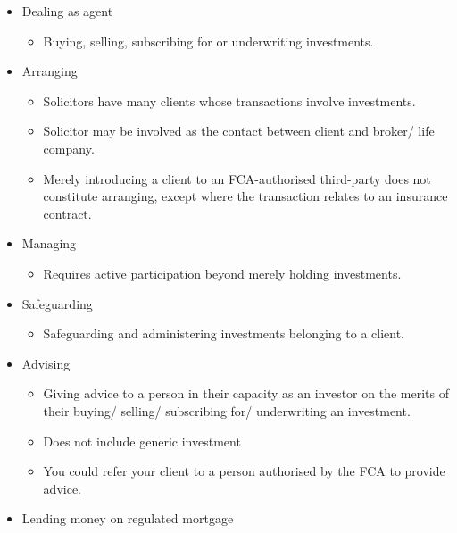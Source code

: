 \documentclass[
]{article}
\providecommand{\tightlist}{%
  \setlength{\itemsep}{0pt}\setlength{\parskip}{0pt}}
\begin{document}
\begin{itemize}
\tightlist
\item
  Dealing as agent

  \begin{itemize}
  \tightlist
  \item
    Buying, selling, subscribing for or underwriting investments.
  \end{itemize}
\item
  Arranging

  \begin{itemize}
  \tightlist
  \item
    Solicitors have many clients whose transactions involve investments.
  \item
    Solicitor may be involved as the contact between client and broker/
    life company.
  \item
    Merely introducing a client to an FCA-authorised third-party does
    not constitute arranging, except where the transaction relates to an
    insurance contract.
  \end{itemize}
\item
  Managing

  \begin{itemize}
  \tightlist
  \item
    Requires active participation beyond merely holding investments.
  \end{itemize}
\item
  Safeguarding

  \begin{itemize}
  \tightlist
  \item
    Safeguarding and administering investments belonging to a client.
  \end{itemize}
\item
  Advising

  \begin{itemize}
  \tightlist
  \item
    Giving advice to a person in their capacity as an investor on the
    merits of their buying/ selling/ subscribing for/ underwriting an
    investment.
  \item
    Does not include generic investment
  \item
    You could refer your client to a person authorised by the FCA to
    provide advice.
  \end{itemize}
\item
  Lending money on regulated mortgage
\end{itemize}
\end{document}

